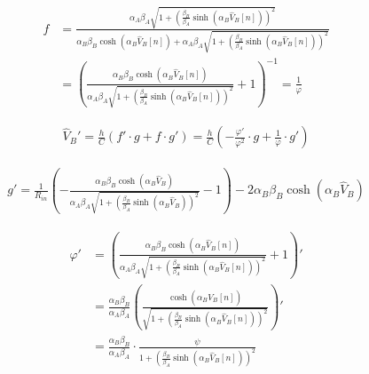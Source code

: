 	
	\begin{equation}
		\begin{split}
			f &= \frac{\alpha_{A}\beta_{A}\sqrt{1+\left(\frac{\beta_{B}}{\beta_{A}}\sinh(\alpha_{B}\widehat V_{B}[n])\right)^{2}}}{\alpha_{B}\beta_{B}\cosh(\alpha_{B}\widehat V_{B}[n])+\alpha_{A}\beta_{A}\sqrt{1+\left(\frac{\beta_{B}}{\beta_{A}}\sinh(\alpha_{B}\widehat V_{B}[n])\right)^{2}}}\\
			&= \left(\frac{\alpha_{B}\beta_{B}\cosh(\alpha_{B}\widehat V_{B}[n])}{\alpha_{A}\beta_{A}\sqrt{1+\left(\frac{\beta_{B}}{\beta_{A}}\sinh(\alpha_{B}\widehat V_{B}[n])\right)^{2}}}+1\right)^{-1} = \frac{1}{\varphi}
		\end{split}
	\end{equation}

	
	\begin{equation}
		\begin{split}
			\widehat V_{B}' = \frac{h}{C}(f'\cdot g+f\cdot g') = \frac{h}{C}\left(-\frac{\varphi'}{\varphi^{2}}\cdot g+\frac{1}{\varphi}\cdot g'\right)
		\end{split}
	\end{equation}

	\begin{equation}
		\begin{split}
			g' = \frac{1}{R_{in}}\left(-\frac{\alpha_{B}\beta_{B}\cosh(\alpha_{B}\widehat V_{B})}{\alpha_{A}\beta_{A}\sqrt{1+\left(\frac{\beta_{B}}{\beta_{A}}\sinh(\alpha_{B}\widehat V_{B})\right)^{2}}}-1\right)-2\alpha_{B}\beta_{B}\cosh(\alpha_{B}\widehat V_{B})
		\end{split}
	\end{equation}

	\begin{equation}
		\begin{split}
			\varphi' &= \left(\frac{\alpha_{B}\beta_{B}\cosh(\alpha_{B}\widehat V_{B}[n])}{\alpha_{A}\beta_{A}\sqrt{1+\left(\frac{\beta_{B}}{\beta_{A}}\sinh(\alpha_{B}\widehat V_{B}[n])\right)^{2}}}+1\right)'\\
			&= \frac{\alpha_{B}\beta_{B}}{\alpha_{A}\beta_{A}}\left(\frac{\cosh(\alpha_{B}\widehat V_{B}[n])}{\sqrt{1+\left(\frac{\beta_{B}}{\beta_{A}}\sinh(\alpha_{B}\widehat V_{B}[n])\right)^{2}}}\right)'\\
			&= \frac{\alpha_{B}\beta_{B}}{\alpha_{A}\beta_{A}}\cdot\frac{\psi}{1+\left(\frac{\beta_{B}}{\beta_{A}}\sinh(\alpha_{B}\widehat V_{B}[n])\right)^{2}}
		\end{split}
	\end{equation}
	

